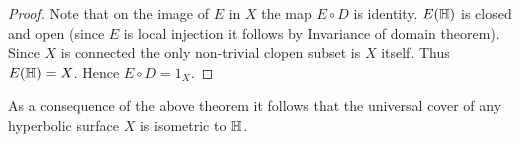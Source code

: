 \begin{proof}
  Note that on the image of $E$ in $X$ the map $E\circ D$ is identity. $E(\mathbb{H})$ is closed and open (since $E$ is local injection it follows by Invariance of domain theorem). Since $X$ is connected the only non-trivial clopen subset is $X$ itself. Thus $E(\mathbb{H}) = X$. Hence $E\circ D = 1_X$.
\end{proof}

As a consequence of the above theorem it follows that the universal cover of any hyperbolic surface $X$ is isometric to $\mathbb{H}$.
